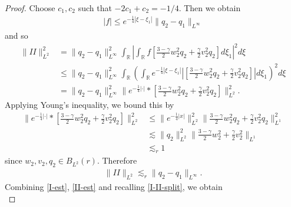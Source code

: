 \documentclass[12pt,reqno]{amsart}
\numberwithin{equation}{section}  %
\numberwithin{figure}{section}
\newcommand{\rr}{\mathbb{R}}
\begin{document}
\begin{proof}
%
%
Choose $c_{1}, c_{2}$ such that $-2c_{1} + c_{2} = -1/4$. Then we obtain
%
%
\begin{equation*}
\begin{split}
  | f | \le e^{-\frac{1}{4} | \xi - \xi_{1} |} \| q_{2} - q_{1} \|_{L^{\infty}}
\end{split}
\end{equation*}
%
%
and so
%
%
%
%
\begin{equation*}
\begin{split}
  \| II \|_{L^{2}}^{2}
  & = \| q_{2} - q_{1} \|_{L^{\infty}}^{2} \int_{\rr} |\int_{\rr} f\left[ \frac{3-\gamma}{2}w_{2}^{2}q_{2} + \frac{\gamma}{2}
    v_{2}^{2} q_{2} \right]d \xi_{1} | ^{2} d \xi  
    \\
    & \le \| q_{2} - q_{1} \|_{L^{\infty}}^{2} \int_{\rr} \left (\int_{\rr} e^{-\frac{1}{4}| \xi - \xi_{1} |} |\left[ \frac{3-\gamma}{2}w_{2}^{2}q_{2} + \frac{\gamma}{2}
    v_{2}^{2} q_{2} \right] | d \xi_{1} \right ) ^{2} d \xi 
    \\
    & = \| q_{2} - q_{1} \|_{L^{\infty}}^{2} \| e^{-\frac{1}{4} | \cdot |} * \left[ \frac{3 - \gamma}{2}w_{2}^{2} q_{2}
    + \frac{\gamma}{2}v_{2}^{2} q_{2}  \right]  \|_{L^{2}}^{2}.
  \end{split}
\end{equation*}
%
%
Applying Young's inequality, we bound this by
%
%
%
%
\begin{equation*}
\begin{split}
\| e^{-\frac{1}{4} | \cdot |} * \left[ \frac{3 - \gamma}{2}w_{2}^{2} q_{2}
    + \frac{\gamma}{2}v_{2}^{2} q_{2}  \right]  \|_{L^{2}}^{2}
    & \le \| e^{-\frac{1}{4}| x |} \|_{L^{2}}^{2} \| \frac{3 - \gamma}{2}w_{2}^{2} q_{2}
    + \frac{\gamma}{2}v_{2}^{2} q_{2}\|_{L^{1}}^{2}
    \\
    & \lesssim \| q_{2} \|_{L^{2}}^{2} \| \frac{3 - \gamma}{2} w_{2}^{2} + \frac{\gamma}{2} v_{2}^{2} \|_{L^{1}}
    \\
    & \lesssim_{r} 1 
\end{split}
\end{equation*}
%
since $w_{2}, v_{2}, q_{2} \in B_{L^{2}}(r)$.
%
Therefore
%
%
\begin{equation}
  \label{II-est}
\begin{split}
  \| II \|_{L^{2}} \lesssim_{r} \| q_{2} - q_{1} \|_{L^{\infty}}.
\end{split}
\end{equation}
%
%
Combining \eqref{I-est}, \eqref{II-est} and recalling \eqref{I-II-split}, we obtain
%
%
%
%
\begin{equation}

\end{equation}
\end{proof}
\end{document}
